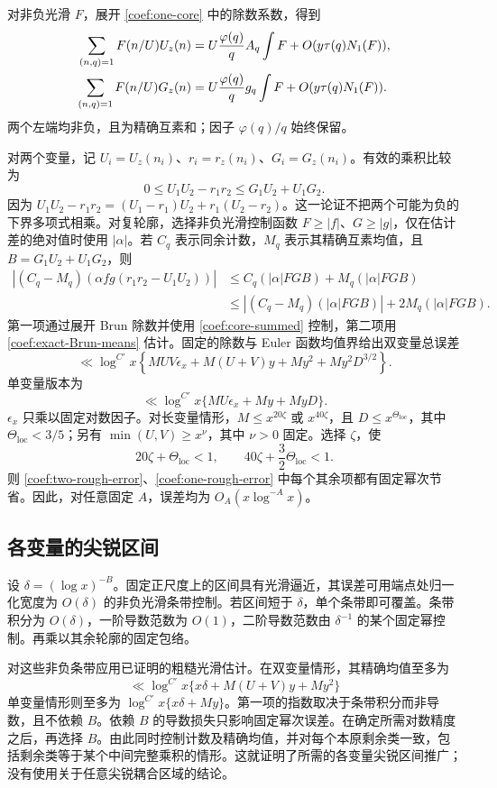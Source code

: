 对非负光滑 $F$，展开 \eqref{coef:one-core} 中的除数系数，得到
\begin{align}
 \sum_{(n,q)=1}F(n/U)U_z(n)
 &=U\frac{\varphi(q)}q A_q\int F+O(y\tau(q)N_1(F)),\notag\\
 \sum_{(n,q)=1}F(n/U)G_z(n)
 &=U\frac{\varphi(q)}q g_q\int F+O(y\tau(q)N_1(F)).
 \label{coef:exact-Brun-means}
\end{align}
两个左端均非负，且为精确互素和；因子 $\varphi(q)/q$ 始终保留。

对两个变量，记 $U_i=U_z(n_i)$、$r_i=r_z(n_i)$、$G_i=G_z(n_i)$。有效的乘积比较为
\begin{equation}
 0\le U_1U_2-r_1r_2\le G_1U_2+U_1G_2.
 \label{coef:rough-product-gap}
\end{equation}
因为 $U_1U_2-r_1r_2=(U_1-r_1)U_2+r_1(U_2-r_2)$。这一论证不把两个可能为负的下界多项式相乘。对复轮廓，选择非负光滑控制函数 $F\ge|f|$、$G\ge|g|$，仅在估计差的绝对值时使用 $|\alpha|$。若 $C_q$ 表示同余计数，$M_q$ 表示其精确互素均值，且 $B=G_1U_2+U_1G_2$，则
\begin{align*}
 |(C_q-M_q)(\alpha fg(r_1r_2-U_1U_2))|
 &\le C_q(|\alpha|FGB)+M_q(|\alpha|FGB)\\
 &\le |(C_q-M_q)(|\alpha|FGB)|+2M_q(|\alpha|FGB).
\end{align*}
第一项通过展开 Brun 除数并使用 \eqref{coef:core-summed} 控制，第二项用 \eqref{coef:exact-Brun-means} 估计。固定的除数与 Euler 函数均值界给出双变量总误差
\begin{equation}
 \ll\log^{C'}x\left\{
 MUV\epsilon_x+M(U+V)y+My^2+My^2D^{3/2}\right\}.
 \label{coef:two-rough-error}
\end{equation}
单变量版本为
\begin{equation}
 \ll\log^{C'}x\{MU\epsilon_x+My+MyD\}.
 \label{coef:one-rough-error}
\end{equation}
$\epsilon_x$ 只乘以固定对数因子。对长变量情形，$M\le x^{20\zeta}$ 或 $x^{40\zeta}$，且 $D\le x^{\Theta_{\mathrm{loc}}}$，其中 $\Theta_{\mathrm{loc}}<3/5$；另有 $\min(U,V)\ge x^\nu$，其中 $\nu>0$ 固定。选择 $\zeta$，使
\[
 20\zeta+\Theta_{\mathrm{loc}}<1,\qquad
 40\zeta+\frac32\Theta_{\mathrm{loc}}<1.
\]
则 \eqref{coef:two-rough-error}、\eqref{coef:one-rough-error} 中每个其余项都有固定幂次节省。因此，对任意固定 $A$，误差均为 $O_A(x\log^{-A}x)$。

\subsection{各变量的尖锐区间}

设 $\delta=(\log x)^{-B}$。固定正尺度上的区间具有光滑逼近，其误差可用端点处归一化宽度为 $O(\delta)$ 的非负光滑条带控制。若区间短于 $\delta$，单个条带即可覆盖。条带积分为 $O(\delta)$，一阶导数范数为 $O(1)$，二阶导数范数由 $\delta^{-1}$ 的某个固定幂控制。再乘以其余轮廓的固定包络。

对这些非负条带应用已证明的粗糙光滑估计。在双变量情形，其精确均值至多为
\[
 \ll\log^{C'}x\{x\delta+M(U+V)y+My^2\}
\]
单变量情形则至多为 $\log^{C'}x\{x\delta+My\}$。第一项的指数取决于条带积分而非导数，且不依赖 $B$。依赖 $B$ 的导数损失只影响固定幂次误差。在确定所需对数精度之后，再选择 $B$。由此同时控制计数及精确均值，并对每个本原剩余类一致，包括剩余类等于某个中间完整乘积的情形。这就证明了所需的各变量尖锐区间推广；没有使用关于任意尖锐耦合区域的结论。
